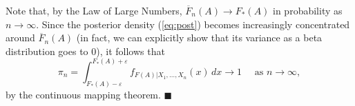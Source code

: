 \documentclass[11pt]{article}
\renewcommand{\qed}{\quad \ensuremath{\blacksquare}}
\newcommand{\e}{\varepsilon} %
\newcommand{\ol}{\overline}
\begin{document}
\begin{enumerate}
\begin{enumerate}
Note that, by the Law of Large Numbers, $\ol F_n(A) \to F_*(A)$ in probability
as $n \to \infty$. Since the posterior density (\ref{eq:post}) becomes
increasingly concentrated around $\ol F_n(A)$ (in fact, we can explicitly show
that its variance as a beta distribution goes to $0$), it follows that
\[\pi_n
    = \int_{F_*(A) - \e}^{F_*(A) + \e} f_{F(A)|X_1,\dots,X_n}(x) \, dx \to 1
    \quad \mbox{ as } n \to \infty,\]
by the continuous mapping theorem. \qed
\end{enumerate}
\end{enumerate}
\end{document}
